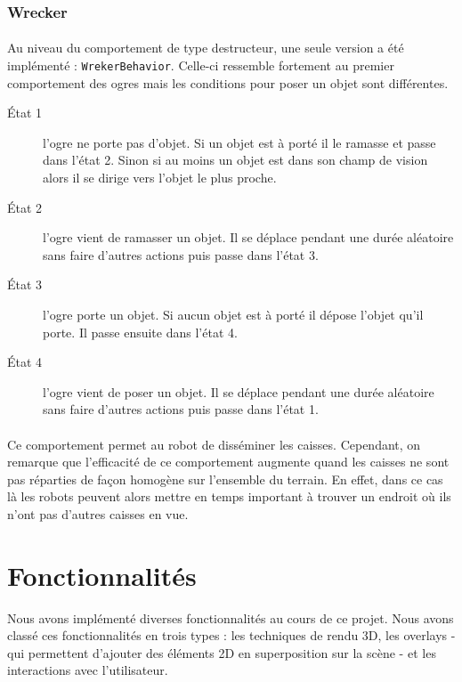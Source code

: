 \subsubsection{Wrecker}
\paragraph{}Au niveau du comportement de type destructeur, une seule version a
été implémenté : \texttt{WrekerBehavior}. Celle-ci ressemble fortement au premier comportement des
ogres mais les conditions pour poser un objet sont différentes.

\begin{description}
    \item[\'Etat 1] l'ogre ne porte pas d'objet. Si un objet est à porté il
        le ramasse et passe dans l'état 2. Sinon si au moins un objet est dans son
        champ de vision alors il se dirige vers l'objet le plus proche.
    \item[\'Etat 2] l'ogre vient de ramasser un objet. Il se déplace pendant une
        durée aléatoire sans faire d'autres actions puis passe dans l'état 3.
    \item[\'Etat 3] l'ogre porte un objet. Si aucun objet est à porté il
        dépose l'objet qu'il porte. Il passe ensuite dans
        l'état 4.
    \item[\'Etat 4] l'ogre vient de poser un objet. Il se déplace pendant une
        durée aléatoire sans faire d'autres actions puis passe dans l'état 1.
\end{description}

\paragraph{}Ce comportement permet au robot de disséminer les caisses.
Cependant, on remarque que l'efficacité de ce comportement augmente quand les
caisses ne sont pas réparties de façon homogène sur l'ensemble du terrain. En
effet, dans ce cas là les robots peuvent alors mettre en temps important à
trouver un endroit où ils n'ont pas d'autres caisses en vue.

\section{Fonctionnalités}

Nous avons implémenté diverses fonctionnalités au cours de ce projet. Nous
avons classé ces fonctionnalités en trois types : les techniques de rendu 3D,
les overlays - qui permettent d'ajouter des éléments 2D en superposition sur
la scène - et les interactions avec l'utilisateur.

